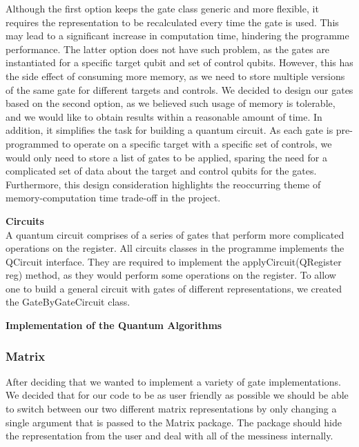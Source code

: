 \documentclass[bibliography=totocnumbered, 10pt]{article}
\theoremstyle{NoticeStyle}
\begin{document}
\begin{myenumerate}
Although the first option keeps the gate class generic and more flexible, it requires the representation to be recalculated every time the gate is used. This may lead to a significant increase in computation time, hindering the programme performance. The latter option does not have such problem, as the gates are instantiated for a specific target qubit and set of control qubits. However, this has the side effect of consuming more memory, as we need to store multiple versions of the same gate for different targets and controls. We decided to design our gates based on the second option, as we believed such usage of memory is tolerable, and we would like to obtain results within a reasonable amount of time. In addition, it simplifies the task for building a quantum circuit. As each gate is pre-programmed to operate on a specific target with a specific set of controls, we would only need to store a list of gates to be applied, sparing the need for a complicated set of data about the target and control qubits for the gates. Furthermore, this design consideration highlights the reoccurring theme of memory-computation time trade-off in the project.
	\item \textbf{Circuits}\\
	A quantum circuit comprises of a series of gates that perform more complicated operations on the register. All circuits classes in the programme implements the QCircuit interface. They are required to implement the applyCircuit(QRegister reg) method, as they would perform some operations on the register. To allow one to build a general circuit with gates of different representations, we created the GateByGateCircuit class. 
	
	\item \textbf{Implementation of the Quantum Algorithms}\\
	
\end{myenumerate}

\subsubsection{Matrix}
After deciding that we wanted to implement a variety of gate implementations. We decided that for our code to be as user friendly as possible we should be able to switch between our two different matrix representations by only changing a single argument that is passed to the Matrix package. The package should hide the representation from the user and deal with all of the messiness internally.
\end{document}
